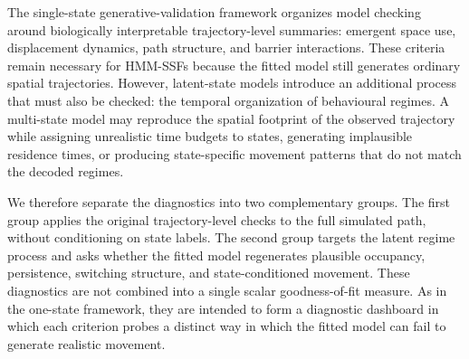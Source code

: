 \documentclass[11pt]{article}
\begin{document}
The single-state generative-validation framework organizes model checking
around biologically interpretable trajectory-level summaries: emergent space
use, displacement dynamics, path structure, and barrier interactions. These
criteria remain necessary for HMM-SSFs because the fitted model still generates
ordinary spatial trajectories. However, latent-state models introduce an
additional process that must also be checked: the temporal organization of
behavioural regimes. A multi-state model may reproduce the spatial footprint
of the observed trajectory while assigning unrealistic time budgets to states,
generating implausible residence times, or producing state-specific movement
patterns that do not match the decoded regimes.

We therefore separate the diagnostics into two complementary groups. The first
group applies the original trajectory-level checks to the full simulated path,
without conditioning on state labels. The second group targets the latent
regime process and asks whether the fitted model regenerates plausible
occupancy, persistence, switching structure, and state-conditioned movement.
These diagnostics are not combined into a single scalar goodness-of-fit
measure. As in the one-state framework, they are intended to form a diagnostic
dashboard in which each criterion probes a distinct way in which the fitted
model can fail to generate realistic movement.
\end{document}
